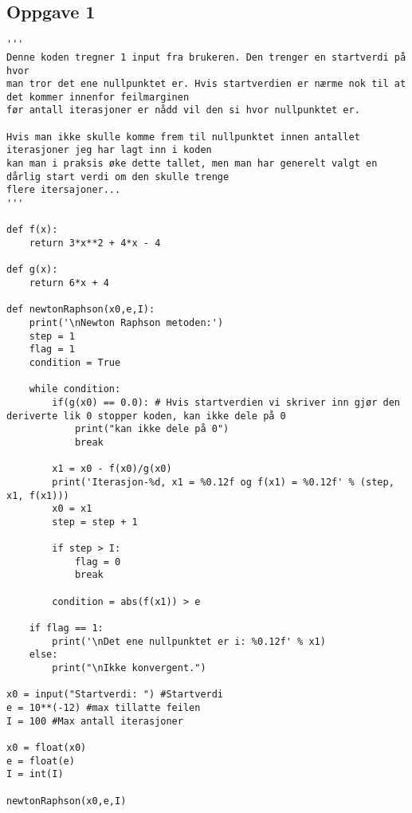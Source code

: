 \subsection{Oppgave 1}
\begin{lstlisting}
'''
Denne koden tregner 1 input fra brukeren. Den trenger en startverdi på hvor
man tror det ene nullpunktet er. Hvis startverdien er nærme nok til at det kommer innenfor feilmarginen
før antall iterasjoner er nådd vil den si hvor nullpunktet er.

Hvis man ikke skulle komme frem til nullpunktet innen antallet iterasjoner jeg har lagt inn i koden
kan man i praksis øke dette tallet, men man har generelt valgt en dårlig start verdi om den skulle trenge
flere itersajoner...
'''

def f(x):
    return 3*x**2 + 4*x - 4

def g(x):
    return 6*x + 4

def newtonRaphson(x0,e,I):
    print('\nNewton Raphson metoden:')
    step = 1
    flag = 1
    condition = True

    while condition:
        if(g(x0) == 0.0): # Hvis startverdien vi skriver inn gjør den deriverte lik 0 stopper koden, kan ikke dele på 0
            print("kan ikke dele på 0")
            break
        
        x1 = x0 - f(x0)/g(x0)
        print('Iterasjon-%d, x1 = %0.12f og f(x1) = %0.12f' % (step, x1, f(x1)))
        x0 = x1
        step = step + 1

        if step > I:
            flag = 0
            break

        condition = abs(f(x1)) > e

    if flag == 1:
        print('\nDet ene nullpunktet er i: %0.12f' % x1)
    else:
        print("\nIkke konvergent.")

x0 = input("Startverdi: ") #Startverdi
e = 10**(-12) #max tillatte feilen
I = 100 #Max antall iterasjoner

x0 = float(x0)
e = float(e)
I = int(I) 

newtonRaphson(x0,e,I)
\end{lstlisting}

